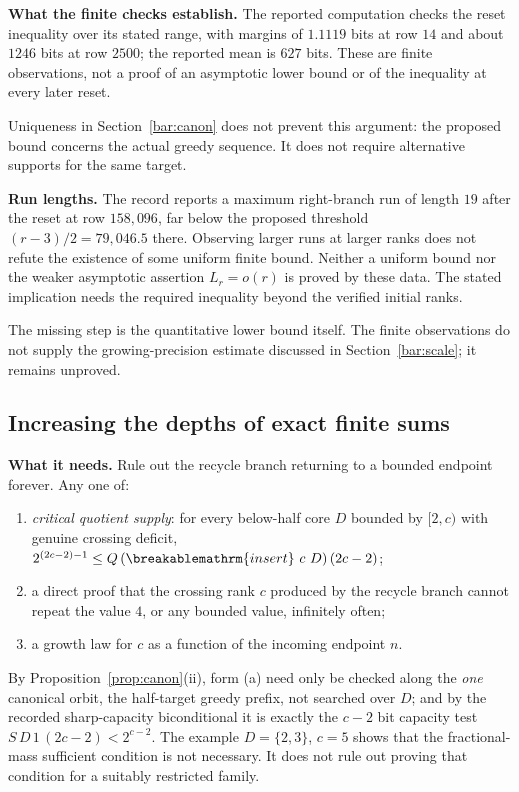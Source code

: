 \documentclass[11pt]{article}
\theoremstyle{plain}
\theoremstyle{definition}
\theoremstyle{remark}
\renewcommand{\mathrm}[1]{\ifmmode\breakablemathrm{#1}\else\textrm{#1}\fi}%
\begin{document}
\textbf{What the finite checks establish.} The reported computation
checks the reset inequality over its stated range, with margins of
$1.1119$ bits at row $14$ and about $1246$ bits at row $2500$; the reported
mean is $627$ bits.  These are finite observations, not a proof of an
asymptotic lower bound or of the inequality at every later reset.

Uniqueness in Section~\ref{bar:canon} does not prevent this argument:
the proposed bound concerns the actual greedy sequence.  It does not
require alternative supports for the same target.

\textbf{Run lengths.} The record reports a maximum right-branch run of
length $19$ after the reset at row $158{,}096$, far below the proposed threshold
$(r-3)/2=79{,}046.5$ there.  Observing larger runs at larger ranks does not
refute the existence of some uniform finite bound.  Neither a uniform
bound nor the weaker asymptotic assertion $L_r=o(r)$ is proved by these
data.  The stated implication needs the required inequality beyond the
verified initial ranks.

The missing step is the quantitative lower bound itself.  The finite
observations do not supply the growing-precision estimate discussed in
Section~\ref{bar:scale}; it remains unproved.

\subsection{Increasing the depths of exact finite sums}
\label{ssec:route-2}

\textbf{What it needs.} Rule out the recycle branch returning to a bounded endpoint forever. Any
one of:
\begin{enumerate}[nosep,label=(\alph*)]
\item \emph{critical quotient supply}: for every below-half core $D$ bounded by $[2,c)$
  with genuine crossing deficit, $2^{(2c-2)-1} \le \ensuremath{Q}\,(\mathrm{insert}\
  c\ D)\,(2c-2)$;
\item a direct proof that the crossing rank $c$ produced by the recycle branch cannot repeat the
  value $4$, or any bounded value, infinitely often;
\item a growth law for $c$ as a function of the incoming endpoint $n$.
\end{enumerate}
By Proposition~\ref{prop:canon}(ii), form (a) need only be checked along the \emph{one} canonical
orbit, the half-target greedy prefix, not searched over $D$; and by the recorded sharp-capacity
biconditional it is exactly the $c-2$ bit capacity test
$\ensuremath{S}\,D\,1\,(2c-2) < 2^{c-2}$. The example $D=\{2,3\}$, $c=5$ shows that the fractional-mass
sufficient condition is not necessary.  It does not rule out proving that
condition for a suitably restricted family.
\end{document}
